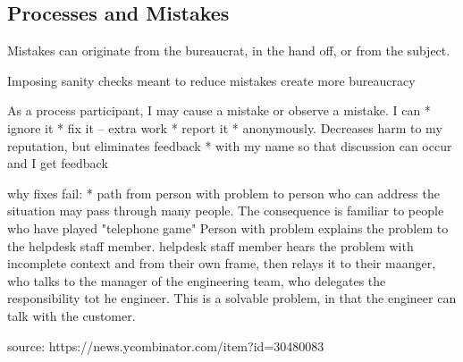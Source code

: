 \subsection{Processes and Mistakes}

Mistakes can originate from the bureaucrat, in the hand off, or from the subject.

Imposing sanity checks meant to reduce mistakes create more bureaucracy 


As a process participant, I may cause a mistake or observe a mistake. 
I can 
* ignore it
* fix it -- extra work
* report it
    * anonymously. Decreases harm to my reputation, but eliminates feedback
    * with my name so that discussion can occur and I get feedback
    
    
    

why fixes fail:
* path from person with problem to person who can address the situation may pass through many people. 
The consequence is familiar to people who have played "telephone game"
Person with problem explains the problem to the helpdesk staff member. helpdesk staff member hears the problem with incomplete context and from their own frame, then relays it to their maanger, who talks to the manager of the engineering team, who delegates the responsibility tot he engineer. 
This is a solvable problem, in that the engineer can talk with the customer. 

source: 
https://news.ycombinator.com/item?id=30480083